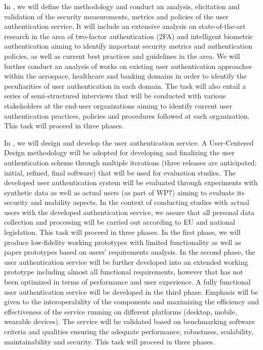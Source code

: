 \begin{Workpackage}{\thewpno}
\begin{Task}
\TaskResults{%
}
\TaskHeader{}

In \theTask, we will define the methodology and conduct an analysis, elicitation and validation of the security measurements, metrics and policies of the user authentication service. It will include an extensive analysis on state-of-the-art research in the area of two-factor authentication (2FA) and intelligent biometric authentication aiming to identify important security metrics and authentication policies, as well as current best practices and guidelines in the area. We will further conduct an analysis of works on existing user authentication approaches within the aerospace, healthcare and banking domains in order to identify the peculiarities of user authentication in each domain. The task will also entail a series of semi-structured interviews that will be conducted with various stakeholders at the end-user organizations aiming to identify current user authentication practices, policies and procedures followed at each organization. This task will proceed in three phases. 
\end{Task}

\begin{Task}

\TaskResults{%
}
\TaskHeader{}

In \theTask, we will design and develop the user authentication service. A User-Centered Design methodology will be adopted for developing and finalizing the user authentication scheme through multiple iterations (three releases are anticipated; initial, refined, final software) that will be used for evaluation studies. The developed user authentication system will be evaluated through experiments with synthetic data as well as actual users (as part of WP7) aiming to evaluate its security and usability aspects. In the context of conducting studies with actual users with the developed authentication service, we assure that all personal data collection and processing will be carried out according to EU and national legislation. This task will proceed in three phases. In the first phase, we will produce low-fidelity working prototypes with limited functionality as well as paper prototypes based on users’ requirements analysis. In the second phase, the user authentication service will be further developed into an extended working prototype including almost all functional requirements, however that has not been optimized in terms of performance and user experience. A fully functional user authentication service will be developed in the third phase. Emphasis will be given to the interoperability of the components and maximizing the efficiency and effectiveness of the service running on different platforms (desktop, mobile, wearable devices). The service will be validated based on benchmarking software criteria and qualities ensuring the adequate performance, robustness, scalability, maintainability and security. This task will proceed in three phases. 
\end{Task}


\end{Workpackage}
